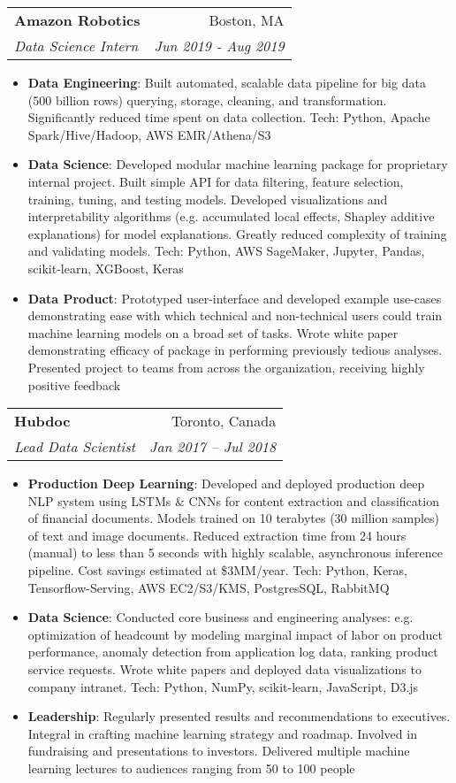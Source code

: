 \documentclass[letterpaper,11pt]{article}
\makeatletter
\newcommand{\resumeItem}[2]{
  \item\small{
    \textbf{#1}{: #2 \vspace{-2pt}}
  }
}
\newcommand{\resumeSubheading}[4]{
  \vspace{-1pt}\item
    \begin{tabular*}{0.97\textwidth}[t]{l@{\extracolsep{\fill}}r}
      \textbf{#1} & #2 \\
      \textit{\small#3} & \textit{\small #4} \\
    \end{tabular*}\vspace{-5pt}
}
\newcommand{\resumeItemListStart}{\begin{itemize}}
\newcommand{\resumeItemListEnd}{\end{itemize}\vspace{-5pt}}
\makeatother
\begin{document}
  \resumeSubheading
    {Amazon Robotics}{Boston, MA}
    {Data Science Intern}{Jun 2019 - Aug 2019}
    \resumeItemListStart
      \resumeItem{Data Engineering}
        {Built automated, scalable data pipeline for big data (500 billion rows) querying, storage, cleaning,
        and transformation. Significantly reduced time spent on data collection. Tech: Python, Apache Spark/Hive/Hadoop, AWS EMR/Athena/S3}
      \resumeItem{Data Science}
        {Developed modular machine learning package for proprietary internal project. Built simple API for data filtering,
        feature selection, training, tuning, and testing models. Developed visualizations and interpretability algorithms
        (e.g. accumulated local effects, Shapley additive explanations) for model explanations. Greatly reduced complexity
        of training and validating models. Tech: Python, AWS SageMaker, Jupyter, Pandas, scikit-learn, XGBoost, Keras}
      \resumeItem{Data Product}
        {Prototyped user-interface and developed example use-cases demonstrating ease with which technical and non-technical
        users could train machine learning models on a broad set of tasks. Wrote white paper demonstrating efficacy of package
        in performing previously tedious analyses. Presented project to teams from across the organization, receiving highly positive feedback}
    \resumeItemListEnd

    \resumeSubheading
      {Hubdoc}{Toronto, Canada}
      {Lead Data Scientist}{Jan 2017 -- Jul 2018}
      \resumeItemListStart
        \resumeItem{Production Deep Learning}
          {Developed and deployed production deep NLP system using LSTMs \& CNNs for content extraction and
          classification of financial documents. Models trained on 10 terabytes (30 million samples) of text and image documents.
          Reduced extraction time from 24 hours (manual) to less than 5 seconds with highly scalable, asynchronous inference pipeline.
          Cost savings estimated at \$3MM/year. Tech: Python, Keras, Tensorflow-Serving, AWS EC2/S3/KMS, PostgresSQL, RabbitMQ}
        \resumeItem{Data Science}
          {Conducted core business and engineering analyses: e.g. optimization of headcount by modeling marginal impact of labor
          on product performance, anomaly detection from application log data, ranking product service requests. Wrote white papers and
          deployed data visualizations to company intranet. Tech: Python, NumPy, scikit-learn, JavaScript, D3.js}
        \resumeItem{Leadership}
          {Regularly presented results and recommendations to executives. Integral in crafting machine learning strategy and
          roadmap. Involved in fundraising and presentations to investors. Delivered multiple machine learning lectures to
          audiences ranging from 50 to 100 people}
      \resumeItemListEnd
\end{document}
